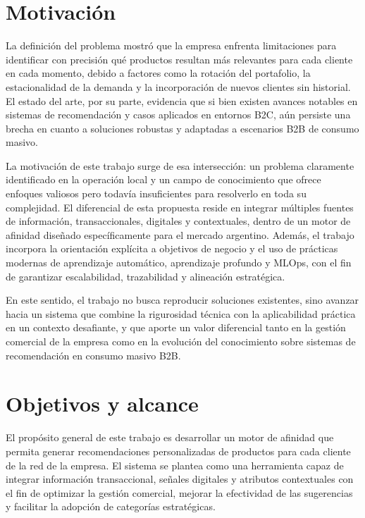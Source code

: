 
\section{Motivación}

La definición del problema mostró que la empresa enfrenta limitaciones para identificar con precisión qué productos resultan más relevantes para cada cliente en cada momento, debido a factores como la rotación del portafolio, la estacionalidad de la demanda y la incorporación de nuevos clientes sin historial. El estado del arte, por su parte, evidencia que si bien existen avances notables en sistemas de recomendación y casos aplicados en entornos B2C, aún persiste una brecha en cuanto a soluciones robustas y adaptadas a escenarios B2B de consumo masivo.

La motivación de este trabajo surge de esa intersección: un problema claramente identificado en la operación local y un campo de conocimiento que ofrece enfoques valiosos pero todavía insuficientes para resolverlo en toda su complejidad. El diferencial de esta propuesta reside en integrar múltiples fuentes de información, transaccionales, digitales y contextuales, dentro de un motor de afinidad diseñado específicamente para el mercado argentino. Además, el trabajo incorpora la orientación explícita a objetivos de negocio y el uso de prácticas modernas de aprendizaje automático, aprendizaje profundo y MLOps, con el fin de garantizar escalabilidad, trazabilidad y alineación estratégica.

En este sentido, el trabajo no busca reproducir soluciones existentes, sino avanzar hacia un sistema que combine la rigurosidad técnica con la aplicabilidad práctica en un contexto desafiante, y que aporte un valor diferencial tanto en la gestión comercial de la empresa como en la evolución del conocimiento sobre sistemas de recomendación en consumo masivo B2B.



\section{Objetivos y alcance}

El propósito general de este trabajo es desarrollar un motor de afinidad que permita generar recomendaciones personalizadas de productos para cada cliente de la red de la empresa. El sistema se plantea como una herramienta capaz de integrar información transaccional, señales digitales y atributos contextuales con el fin de optimizar la gestión comercial, mejorar la efectividad de las sugerencias y facilitar la adopción de categorías estratégicas.

